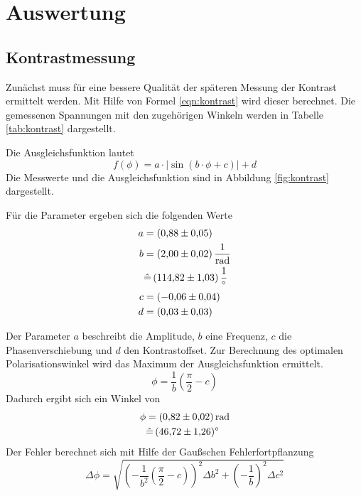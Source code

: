 \section{Auswertung}
\subsection{Kontrastmessung}
Zunächst muss für eine bessere Qualität der späteren Messung der Kontrast
ermittelt werden. Mit Hilfe von Formel \eqref{eqn:kontrast} wird dieser
berechnet. Die gemessenen Spannungen mit den zugehörigen Winkeln werden in
Tabelle \ref{tab:kontrast} dargestellt.



Die Ausgleichsfunktion lautet
\begin{equation}
  f(\phi) = a \cdot \lvert \sin(b \cdot \phi +c) \rvert +d
\end{equation}
Die Messwerte und die Ausgleichsfunktion sind in Abbildung \ref{fig:kontrast}
dargestellt.

Für die Parameter ergeben sich die folgenden Werte
\begin{align*}
  a &= \SI{0.88 \pm 0.05}{} \\
  b &= \SI{2.00 \pm 0.02}{\per\radian} \\
    &\hat{=}\, \SI{114.82 \pm 1.03}{\per\degree} \\
  c &= \SI{-0.06 \pm 0.04}{} \\
  d &= \SI{0.03 \pm 0.03}{} \\
\end{align*}

Der Parameter $a$ beschreibt die Amplitude, $b$ eine Frequenz, $c$ die
Phasenverschiebung und $d$ den Kontrastoffset.
Zur Berechnung des optimalen Polarisationswinkel wird das Maximum der
Ausgleichsfunktion ermittelt.
\begin{equation}
  \phi = \frac{1}{b} \left(\frac{\pi}{2} -c \right)
\end{equation}
Dadurch ergibt sich ein Winkel von
\begin{align*}
  \phi &= \SI{0.82 \pm 0.02}{\radian} \\
       &\hat{=} \, \SI{46.72 \pm 1.26}{\degree} \\
\end{align*}
Der Fehler berechnet sich mit Hilfe der Gaußschen Fehlerfortpflanzung
\begin{equation}
  \Delta \phi =\sqrt{\left(- \frac{1}{b^2} \left(\frac{\pi}{2} -c \right)  \right)^2
  \Delta b^2 + \left(- \frac{1}{b}\right)^2 \Delta c^2}
\end{equation}

